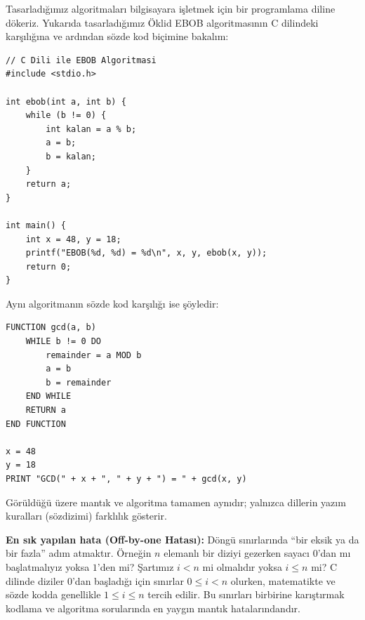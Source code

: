 Tasarladığımız algoritmaları bilgisayara işletmek için bir programlama diline dökeriz. Yukarıda tasarladığımız Öklid EBOB algoritmasının C dilindeki karşılığına ve ardından sözde kod biçimine bakalım:

\begin{lstlisting}[language=CTemel]
// C Dili ile EBOB Algoritmasi
#include <stdio.h>

int ebob(int a, int b) {
    while (b != 0) {
        int kalan = a % b;
        a = b;
        b = kalan;
    }
    return a;
}

int main() {
    int x = 48, y = 18;
    printf("EBOB(%d, %d) = %d\n", x, y, ebob(x, y));
    return 0;
}
\end{lstlisting}

Aynı algoritmanın sözde kod karşılığı ise şöyledir:

\begin{lstlisting}
FUNCTION gcd(a, b)
    WHILE b != 0 DO
        remainder = a MOD b
        a = b
        b = remainder
    END WHILE
    RETURN a
END FUNCTION

x = 48
y = 18
PRINT "GCD(" + x + ", " + y + ") = " + gcd(x, y)\end{lstlisting}

Görüldüğü üzere mantık ve algoritma tamamen aynıdır; yalnızca dillerin yazım kuralları (sözdizimi) farklılık gösterir.

\begin{caution}
\textbf{En sık yapılan hata (Off-by-one Hatası):} Döngü sınırlarında ``bir eksik ya da bir fazla'' adım atmaktır. Örneğin $n$ elemanlı bir diziyi gezerken sayacı $0$'dan mı başlatmalıyız yoksa $1$'den mi? Şartımız $i < n$ mi olmalıdır yoksa $i \le n$ mi? 
C dilinde diziler $0$'dan başladığı için sınırlar $0 \le i < n$ olurken, matematikte ve sözde kodda genellikle $1 \le i \le n$ tercih edilir. Bu sınırları birbirine karıştırmak kodlama ve algoritma sorularında en yaygın mantık hatalarındandır.
\end{caution}
